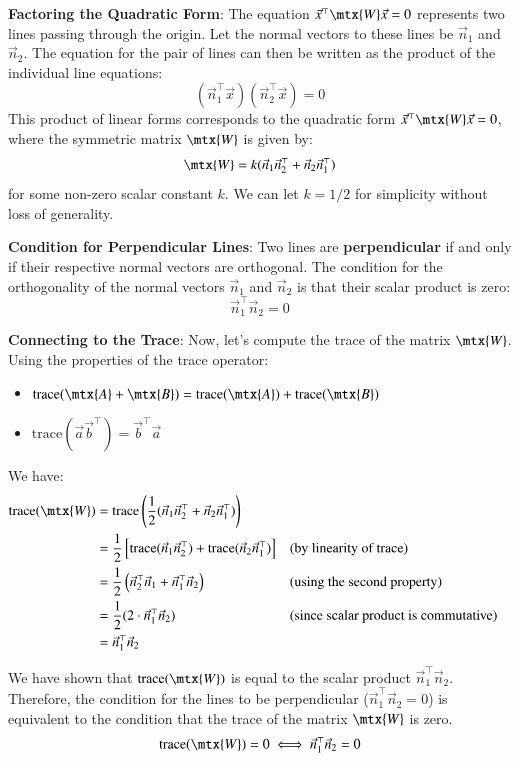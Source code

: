\documentclass[journal]{IEEEtran}
\begin{document}
\begin{enumerate}
   \textbf{Factoring the Quadratic Form}: The equation $\vec{x}^\top \mtx{W} \vec{x} = 0$ represents two lines passing through the origin. Let the normal vectors to these lines be $\vec{n}_1$ and $\vec{n}_2$. The equation for the pair of lines can then be written as the product of the individual line equations:
    \[ (\vec{n}_1^\top \vec{x}) (\vec{n}_2^\top \vec{x}) = 0 \]
    This product of linear forms corresponds to the quadratic form $\vec{x}^\top \mtx{W} \vec{x} = 0$, where the symmetric matrix $\mtx{W}$ is given by:
    \[ \mtx{W} = k(\vec{n}_1\vec{n}_2^\top + \vec{n}_2\vec{n}_1^\top) \]
    for some non-zero scalar constant $k$. We can let $k = 1/2$ for simplicity without loss of generality.

    \textbf{Condition for Perpendicular Lines}: Two lines are \textbf{perpendicular} if and only if their respective normal vectors are orthogonal. The condition for the orthogonality of the normal vectors $\vec{n}_1$ and $\vec{n}_2$ is that their scalar product is zero:
    \[ \vec{n}_1^\top \vec{n}_2 = 0 \]

    \textbf{Connecting to the Trace}: Now, let's compute the trace of the matrix $\mtx{W}$. Using the properties of the trace operator:
    \begin{itemize}
        \item $\text{trace}(\mtx{A} + \mtx{B}) = \text{trace}(\mtx{A}) + \text{trace}(\mtx{B})$
        \item $\text{trace}(\vec{a}\vec{b}^\top) = \vec{b}^\top\vec{a}$
    \end{itemize}
    We have:
    \begin{align*}
        \text{trace}(\mtx{W}) &= \text{trace}\left(\frac{1}{2}(\vec{n}_1\vec{n}_2^\top + \vec{n}_2\vec{n}_1^\top)\right) \\
        &= \frac{1}{2} \left[ \text{trace}(\vec{n}_1\vec{n}_2^\top) + \text{trace}(\vec{n}_2\vec{n}_1^\top) \right] && \text{(by linearity of trace)} \\
        &= \frac{1}{2} \left( \vec{n}_2^\top\vec{n}_1 + \vec{n}_1^\top\vec{n}_2 \right) && \text{(using the second property)} \\
        &= \frac{1}{2} (2 \cdot \vec{n}_1^\top\vec{n}_2) && \text{(since scalar product is commutative)} \\
        &= \vec{n}_1^\top\vec{n}_2
    \end{align*}

    We have shown that $\text{trace}(\mtx{W})$ is equal to the scalar product $\vec{n}_1^\top\vec{n}_2$. Therefore, the condition for the lines to be perpendicular ($\vec{n}_1^\top\vec{n}_2 = 0$) is equivalent to the condition that the trace of the matrix $\mtx{W}$ is zero.
    \[ \text{trace}(\mtx{W}) = 0 \iff \vec{n}_1^\top \vec{n}_2 = 0 \]
\end{enumerate}
\end{document}
